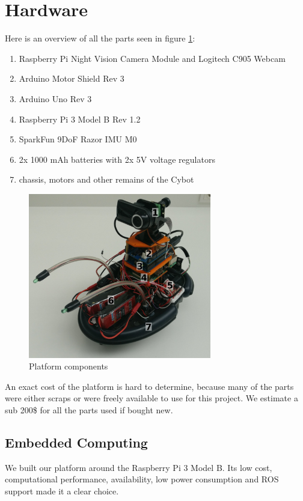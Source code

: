 \documentclass[class=article, crop=false]{standalone}
\begin{document}
\section{Hardware}\label{sec:hardware}

Here is an overview of all the parts seen in figure \ref{fig:platform}:

\begin{enumerate}
 \item Raspberry Pi Night Vision Camera Module and Logitech C905 Webcam
 \item Arduino Motor Shield Rev 3
 \item Arduino Uno Rev 3
 \item Raspberry Pi 3 Model B Rev 1.2
 \item SparkFun 9DoF Razor IMU M0
 \item 2x 1000 mAh batteries with 2x 5V voltage regulators
 \item chassis, motors and other remains of the Cybot
\end{enumerate}

\begin{figure}
  \centering
    \includegraphics[width=8cm]{images/profile_numbered}
    \caption{Platform components}\label{fig:platform}
\end{figure}

An exact cost of the platform is hard to determine, because many of the parts were either scraps or were freely available to use for this project. We estimate a sub 200\$ for all the parts used if bought new.

\subsection{Embedded Computing}\label{subsec:soc}
We built our platform around the Raspberry Pi 3 Model B. Its low cost, computational performance, availability, low power consumption and ROS support made it a clear choice.
\end{document}
